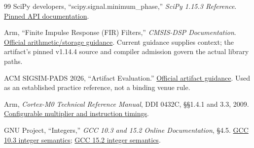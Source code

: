 \documentclass[conference]{IEEEtran}
\begin{document}
\begin{thebibliography}{99}
 SciPy developers, ``scipy.signal.minimum\_phase,'' \emph{SciPy 1.15.3
Reference}.
\href{https://docs.scipy.org/doc/scipy-1.15.3/reference/generated/scipy.signal.minimum_phase.html}{Pinned
API documentation}.

 Arm, ``Finite Impulse Response (FIR) Filters,'' \emph{CMSIS-DSP
Documentation}.
\href{https://arm-software.github.io/CMSIS-DSP/main/group__FIR.html}{Official
arithmetic/storage guidance}. Current guidance supplies context; the
artifact's pinned v1.14.4 source and compiler admission govern the
actual library paths.

 ACM SIGSIM-PADS 2026, ``Artifact Evaluation.''
\href{https://sigsim.acm.org/conf/pads/2026/blog/artifact-evaluation/}{Official
artifact guidance}. Used as an established practice reference, not a
binding venue rule.

 Arm, \emph{Cortex-M0 Technical Reference Manual}, DDI 0432C, §§1.4.1 and
3.3, 2009.
\href{https://documentation-service.arm.com/static/5e8e294afd977155116a6a5b}{Configurable
multiplier and instruction timings}.

 GNU Project, ``Integers,'' \emph{GCC 10.3 and 15.2 Online
Documentation}, §4.5.
\href{https://gcc.gnu.org/onlinedocs/gcc-10.3.0/gcc/Integers-implementation.html}{GCC
10.3 integer semantics};
\href{https://gcc.gnu.org/onlinedocs/gcc-15.2.0/gcc/Integers-implementation.html}{GCC
15.2 integer semantics}.

\end{thebibliography}
\end{document}
